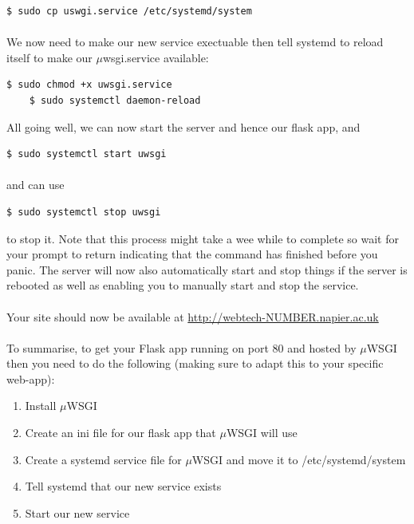 \documentclass[12pt, a4paper, oneside]{book}
\begin{document}
\begin{lstlisting}[style=DOS]
    $ sudo cp uswgi.service /etc/systemd/system
\end{lstlisting}

\paragraph{} We now need to make our new service exectuable then tell systemd to reload itself to make our $\mu$wsgi.service available:

\begin{lstlisting}[style=DOS]
    $ sudo chmod +x uwsgi.service
    $ sudo systemctl daemon-reload
\end{lstlisting}

All going well, we can now start the server and hence our flask app, and

\begin{lstlisting}[style=DOS]
    $ sudo systemctl start uwsgi
\end{lstlisting}

\paragraph{} and can use
\begin{lstlisting}[style=DOS]
    $ sudo systemctl stop uwsgi
\end{lstlisting}

to stop it. Note that this process might take a wee while to complete so wait for your prompt to return indicating that the command has finished before you panic. The server will now also automatically start and stop things if the server is rebooted as well as enabling you to manually start and stop the service.

\paragraph{} Your site should now be available at \url{http://webtech-NUMBER.napier.ac.uk}

\paragraph{} To summarise, to get your Flask app running on port 80 and hosted by $\mu$WSGI then you need to do the following (making sure to adapt this to your specific web-app):

\begin{enumerate}
\item Install $\mu$WSGI
\item Create an ini file for our flask app that $\mu$WSGI will use
\item Create a systemd service file for $\mu$WSGI and move it to /etc/systemd/system
\item Tell systemd that our new service exists
\item Start our new service
\end{enumerate}
\end{document}
